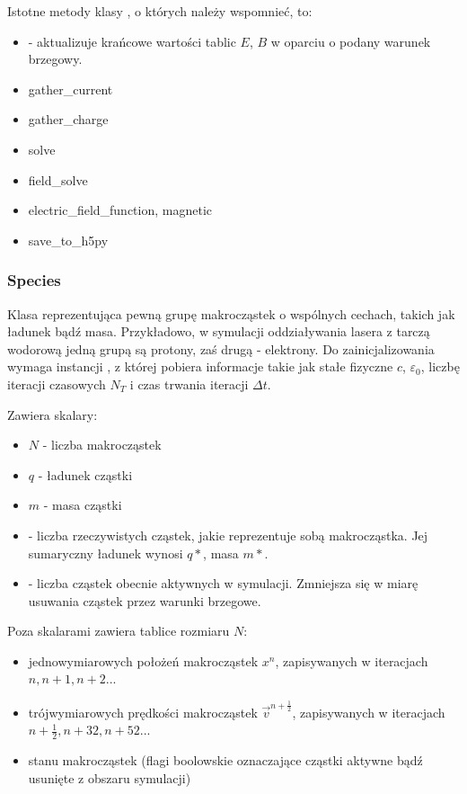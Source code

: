     Istotne metody klasy , o których należy wspomnieć, to:
    \begin{itemize}
         \item {} - aktualizuje krańcowe wartości tablic $E$, $B$ w oparciu o podany warunek brzegowy.
         \item gather\_current 
         \item gather\_charge
         \item solve
         \item field\_solve
         \item electric\_field\_function, magnetic
         \item save\_to\_h5py
    \end{itemize}

    \subsubsection{Species}
    Klasa reprezentująca pewną grupę makrocząstek o wspólnych cechach, takich jak ładunek bądź masa.
    Przykładowo, w symulacji oddziaływania lasera z tarczą wodorową jedną grupą są protony, zaś drugą - elektrony.
    Do zainicjalizowania wymaga instancji , z której pobiera informacje takie jak stałe fizyczne $c$,
    $\varepsilon_0$, liczbę iteracji czasowych $N_T$ i czas trwania iteracji $\Delta t$.

    Zawiera skalary:
    \begin{itemize}
        \item $N$ - liczba makrocząstek
        \item $q$ - ładunek cząstki
        \item $m$ - masa cząstki
        \item {} - liczba rzeczywistych cząstek, jakie reprezentuje sobą makrocząstka. Jej sumaryczny ładunek
             wynosi $q * $, masa $m * $.
        \item {} - liczba cząstek obecnie aktywnych w symulacji. Zmniejsza się w miarę usuwania cząstek przez
            warunki brzegowe.
    \end{itemize}

    Poza skalarami zawiera tablice rozmiaru $N$:
    \begin{itemize}
        \item jednowymiarowych położeń makrocząstek $x^n$, zapisywanych w iteracjach $n, n+1, n+2$...
        \item trójwymiarowych prędkości makrocząstek $\vec{v}^{n+\frac{1}{2}}$, zapisywanych w iteracjach $n+\frac{1}{2}, n+{3}{2}, n+{5}{2}$...
        \item stanu makrocząstek (flagi boolowskie oznaczające cząstki aktywne bądź usunięte z obszaru symulacji)
    \end{itemize}

